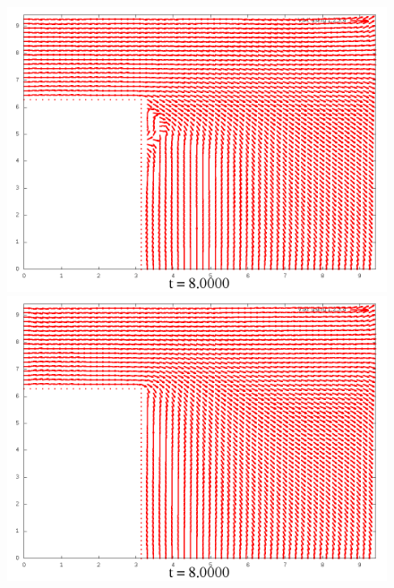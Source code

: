 \documentclass[a4paper, 12pt]{article}
\begin{document}
\begin{figure}[h]
	\begin{minipage}[h]{0.4\linewidth}
		\includegraphics[width=1\linewidth]{./img/01_1_1/V/40}
	\end{minipage}
	\hfill
	\begin{minipage}[h]{0.4\linewidth}
		\includegraphics[width=1\linewidth]{./img/01_1_01/V/40}
	\end{minipage}
\end{figure}
\end{document}
